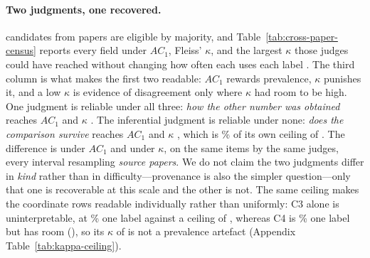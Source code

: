 \documentclass[11pt]{article}
\begin{document}
\paragraph{Two judgments, one recovered.}
\CensusEligible{} candidates from \CensusPapers{} papers are eligible by
majority, and Table~\ref{tab:cross-paper-census} reports every field under
$AC_1$, Fleiss' $\kappa$, and the largest $\kappa$ those judges could have
reached without changing how often each uses each label
\citep[$\kappa_{\max}$;][]{umesh1989maxkappa,sim2005kappa}. The third column is
what makes the first two readable: $AC_1$ rewards prevalence, $\kappa$ punishes
it, and a low $\kappa$ is evidence of disagreement only where $\kappa$ had room
to be high. One judgment is reliable under all three: \emph{how the other number
was obtained} reaches $AC_1$ \DecProv{} and $\kappa$ \DecProvK{}. The
inferential judgment is reliable under none: \emph{does the comparison survive}
reaches $AC_1$ \DecVerdict{} and $\kappa$ \DecVerdictK{}, which is
\KShareVerdict\% of its own ceiling of \KmaxVerdict{}. The difference is
\DecGap{} \DecGapCI{} under $AC_1$ and \DecGapK{} \DecGapKCI{} under $\kappa$,
on the same items by the same judges, every interval resampling \emph{source
papers}. We do not claim the two judgments differ in \emph{kind} rather than in
difficulty---provenance is also the simpler question---only that one is
recoverable at this scale and the other is not. The same ceiling makes the
coordinate rows readable individually rather than uniformly: C3 alone is
uninterpretable, at \PrevCThree\% one label against a ceiling of \KmaxCThree{},
whereas C4 is \PrevCFour\% one label but has room (\KmaxCFour{}), so its
$\kappa$ of \DecCoordKMin{} is not a prevalence artefact (Appendix
Table~\ref{tab:kappa-ceiling}).
\end{document}
